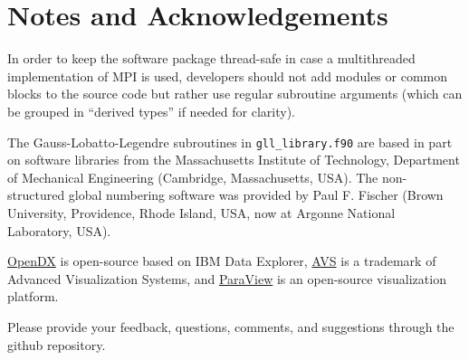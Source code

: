 \chapter*{Notes and Acknowledgements}\label{cha:Notes-and-Acknowledgements}

In order to keep the software package thread-safe in case a multithreaded
implementation of MPI is used, developers should not add modules or
common blocks to the source code but rather use regular subroutine
arguments (which can be grouped in ``derived types'' if needed for
clarity).\newline


The Gauss-Lobatto-Legendre subroutines in \texttt{gll\_library.f90}
are based in part on software libraries from the Massachusetts Institute
of Technology, Department of Mechanical Engineering (Cambridge, Massachusetts, USA).
The non-structured global numbering software was provided by Paul
F. Fischer (Brown University, Providence, Rhode Island, USA, now at Argonne National Laboratory, USA).\newline


\href{http://www.opendx.org}{OpenDX} is open-source based on IBM Data Explorer,
\href{http://www.avs.com}{AVS} is a trademark of Advanced Visualization Systems,
and \href{http://www.paraview.org}{ParaView} is an open-source visualization
platform.{\small{} }{\small \par}


Please provide your feedback, questions, comments, and suggestions through the github repository.


